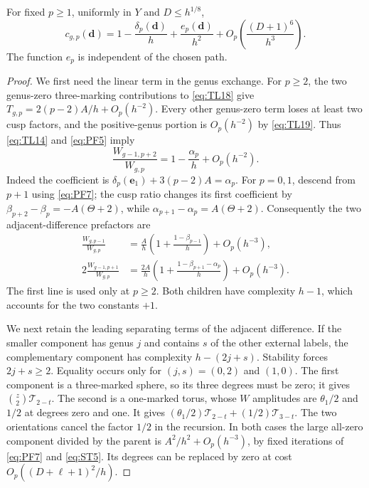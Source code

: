 \begin{lemma}\label{lem:second-profile}
For fixed $p\ge1$, uniformly in $Y$ and $D\le h^{1/8}$,
\begin{equation}
 c_{g,p}(\mathbf d)=1-\frac{\delta_p(\mathbf d)}h
       +\frac{e_p(\mathbf d)}{h^2}
       +O_p\!\left(\frac{(D+1)^6}{h^3}\right).
 \label{eq:ST4}
\end{equation}
The function $e_p$ is independent of the chosen path.
\end{lemma}
\begin{proof}
We first need the linear term in the genus exchange. For $p\ge2$,
the two genus-zero three-marking contributions to \eqref{eq:TL18}
give $T_{g,p}=2(p-2)A/h+O_p(h^{-2})$. Every other genus-zero term
loses at least two cusp factors, and the positive-genus portion is
$O_p(h^{-2})$ by \eqref{eq:TL19}. Thus \eqref{eq:TL14} and
\eqref{eq:PF5} imply
\begin{equation}
 \frac{W_{g-1,p+2}}{W_{g,p}}=1-\frac{\alpha_p}h+O_p(h^{-2}).
 \label{eq:ST5}
\end{equation}
Indeed the coefficient is
$\delta_p(\mathbf e_1)+3(p-2)A=\alpha_p$.
For $p=0,1$, descend from $p+1$ using \eqref{eq:PF7}; the cusp ratio
changes its first coefficient by
$\beta_{p+2}-\beta_p=-A(\Theta+2)$, while
$\alpha_{p+1}-\alpha_p=A(\Theta+2)$.
Consequently the two adjacent-difference prefactors are
\begin{equation}
\begin{split}
 \frac{W_{g,p-1}}{W_{g,p}}
 &=\frac Ah\left(1+\frac{1-\beta_{p-1}}h\right)+O_p(h^{-3}),\\
 2\frac{W_{g-1,p+1}}{W_{g,p}}
 &=\frac{2A}h\left(1+\frac{1-\beta_{p+1}-\alpha_p}h\right)
     +O_p(h^{-3}).
\end{split}
 \label{eq:ST6}
\end{equation}
The first line is used only at $p\ge2$. Both children have complexity
$h-1$, which accounts for the two constants $+1$.

We next retain the leading separating terms of the adjacent difference.
If the smaller component has genus $j$ and contains $s$ of the other
external labels, the complementary component has complexity $h-(2j+s)$.
Stability forces $2j+s\ge2$.
Equality occurs only for $(j,s)=(0,2)$ and $(1,0)$. The first component
is a three-marked sphere, so its three degrees must be zero; it gives
$\binom z2\mathcal T_{2-t}$. The second is a one-marked torus, whose
$W$ amplitudes are $\theta_1/2$ and $1/2$ at degrees zero and one.
It gives $(\theta_1/2)\mathcal T_{2-t}+(1/2)\mathcal T_{3-t}$.
The two orientations cancel the factor $1/2$ in the recursion.
In both cases the large all-zero component divided by the parent is
$A^2/h^2+O_p(h^{-3})$, by fixed iterations of \eqref{eq:PF7} and
\eqref{eq:ST5}. Its degrees can be replaced by zero at cost
$O_p((D+\ell+1)^2/h)$.


\end{proof}
